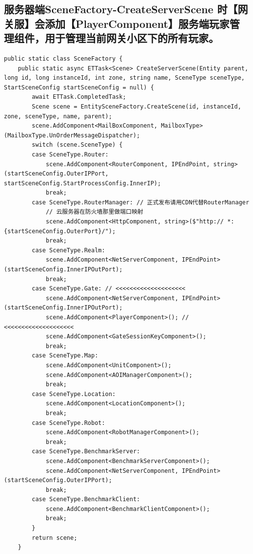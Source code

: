 \documentclass[9pt, b5paper]{article}
\begin{document}
\subsection{服务器端SceneFactory-CreateServerScene 时【网关服】会添加【PlayerComponent】服务端玩家管理组件，用于管理当前网关小区下的所有玩家。}
\label{sec-9-7}
\begin{verbatim}
public static class SceneFactory {
    public static async ETTask<Scene> CreateServerScene(Entity parent, long id, long instanceId, int zone, string name, SceneType sceneType, StartSceneConfig startSceneConfig = null) {
        await ETTask.CompletedTask;
        Scene scene = EntitySceneFactory.CreateScene(id, instanceId, zone, sceneType, name, parent);
        scene.AddComponent<MailBoxComponent, MailboxType>(MailboxType.UnOrderMessageDispatcher);
        switch (scene.SceneType) {
        case SceneType.Router:
            scene.AddComponent<RouterComponent, IPEndPoint, string>(startSceneConfig.OuterIPPort, startSceneConfig.StartProcessConfig.InnerIP);
            break;
        case SceneType.RouterManager: // 正式发布请用CDN代替RouterManager
            // 云服务器在防火墙那里做端口映射
            scene.AddComponent<HttpComponent, string>($"http:// *:{startSceneConfig.OuterPort}/");
            break;
        case SceneType.Realm:
            scene.AddComponent<NetServerComponent, IPEndPoint>(startSceneConfig.InnerIPOutPort);
            break;
        case SceneType.Gate: // <<<<<<<<<<<<<<<<<<<< 
            scene.AddComponent<NetServerComponent, IPEndPoint>(startSceneConfig.InnerIPOutPort);
            scene.AddComponent<PlayerComponent>(); // <<<<<<<<<<<<<<<<<<<< 
            scene.AddComponent<GateSessionKeyComponent>();
            break;
        case SceneType.Map:
            scene.AddComponent<UnitComponent>();
            scene.AddComponent<AOIManagerComponent>();
            break;
        case SceneType.Location:
            scene.AddComponent<LocationComponent>();
            break;
        case SceneType.Robot:
            scene.AddComponent<RobotManagerComponent>();
            break;
        case SceneType.BenchmarkServer:
            scene.AddComponent<BenchmarkServerComponent>();
            scene.AddComponent<NetServerComponent, IPEndPoint>(startSceneConfig.OuterIPPort);
            break;
        case SceneType.BenchmarkClient:
            scene.AddComponent<BenchmarkClientComponent>();
            break;
        }
        return scene;
    }
\end{verbatim}
\end{document}
